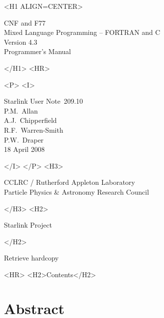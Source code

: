 \documentclass[twoside,11pt]{article}
\newcommand{\stardoccategory}  {Starlink User Note}
\newcommand{\stardocsource}    {sun\stardocnumber}
\newcommand{\stardocnumber}    {209.10}
\newcommand{\stardocauthors}   {P.M.\ Allan\\
                                A.J.\ Chipperfield\\
                                R.F.\ Warren-Smith\\
                                P.W.\ Draper}
\newcommand{\stardocdate}      {18 April 2008}
\newcommand{\stardoctitle}     {CNF and F77 \\ [1ex]
                                Mixed Language Programming -- FORTRAN and C}
\newcommand{\stardocversion}   {Version 4.3}
\newcommand{\stardocmanual}    {Programmer's Manual}
\newcommand{\htmladdnormallink}[2]{#1}
\newcommand{\htmladdimg}[1]{}
\newcommand{\htmlref}[2]{#1}
\newcommand{\htmladdtonavigation}[1]{}
\newcommand{\xlabel}[1]{}
\renewcommand{\_}{\texttt{\symbol{95}}}
\begin{document}
\begin{htmlonly}
   \xlabel{}
   \begin{rawhtml} <H1 ALIGN=CENTER> \end{rawhtml}
      \stardoctitle\\
      \stardocversion\\
      \stardocmanual
   \begin{rawhtml} </H1> <HR> \end{rawhtml}


   \begin{rawhtml} <P> <I> \end{rawhtml}
   \stardoccategory\ \stardocnumber \\
   \stardocauthors \\
   \stardocdate
   \begin{rawhtml} </I> </P> <H3> \end{rawhtml}
      \htmladdnormallink{CCLRC}{http://www.cclrc.ac.uk} /
      \htmladdnormallink{Rutherford Appleton Laboratory}
                        {http://www.cclrc.ac.uk/ral} \\
      \htmladdnormallink{Particle Physics \& Astronomy Research Council}
                        {http://www.pparc.ac.uk} \\
   \begin{rawhtml} </H3> <H2> \end{rawhtml}
      \htmladdnormallink{Starlink Project}{http://www.starlink.rl.ac.uk/}
   \begin{rawhtml} </H2> \end{rawhtml}
   \htmladdnormallink{\htmladdimg{source.gif} Retrieve hardcopy}
      {http://www.starlink.rl.ac.uk/cgi-bin/hcserver?\stardocsource}\\

  \label{stardoccontents}
  \begin{rawhtml} 
    <HR>
    <H2>Contents</H2>
  \end{rawhtml}
  \htmladdtonavigation{\htmlref{\htmladdimg{contents_motif.gif}}
        {stardoccontents}}

  \section{\xlabel{abstract}Abstract}
\end{htmlonly}
\end{document}
